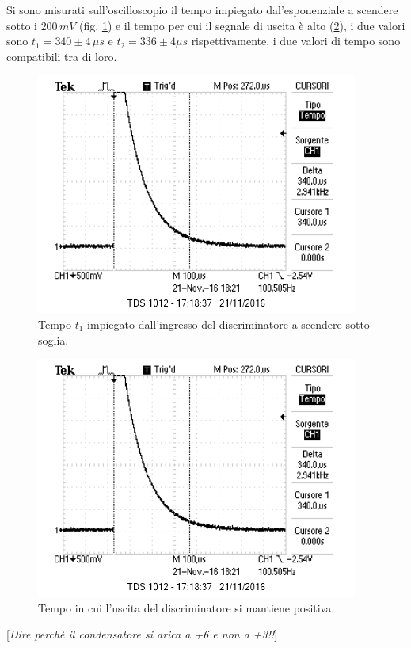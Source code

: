 \documentclass[10pt,a4paper]{article}
\newcommand{\rem}[1]{[\emph{#1}]}
\begin{document}
Si sono misurati sull'oscilloscopio il tempo impiegato dal'esponenziale a scendere sotto i  $200 \, mV$ (fig. \ref{tempoEspo}) e il tempo per cui il segnale di uscita è alto (\ref{tempoUscita}), i due valori sono $t_1 = 340 \pm 4 \, \mu s$ e  $t_2 = 336 \pm 4 \mu s$ rispettivamente, i due valori di tempo sono compatibili tra di loro.

\begin{figure}[h]
\centering
\includegraphics[scale=1.0]{immagini/periodoEsponenziale.png}
\caption{Tempo $t_1$ impiegato dall'ingresso del discriminatore a scendere sotto soglia.}
\label{tempoEspo}
\end{figure}

\begin{figure}[h]
\centering
\includegraphics[scale=1.0]{immagini/periodoEsponenziale.png}
\caption{Tempo in cui l'uscita del discriminatore si mantiene positiva.}
\label{tempoUscita}
\end{figure}

\rem{Dire perchè il condensatore si arica a +6 e non a +3!!}
\end{document}
